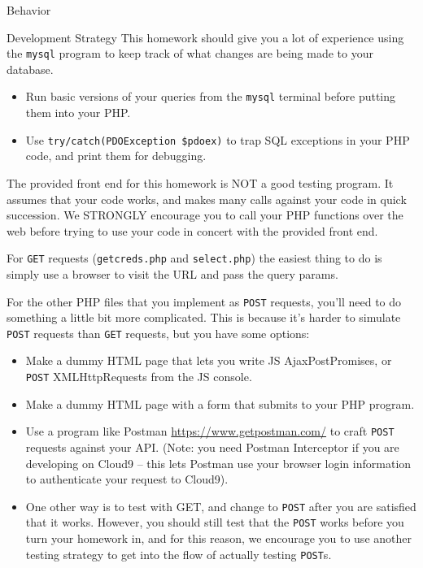 \documentclass[programming]{../../../../mfcs}
\begin{document}
\begin{question}{Behavior}
\end{question}

\begin{question}{Development Strategy}
    This homework should give you a lot of experience using the \texttt{mysql} program to keep track of what changes
    are being made to your database.
     \begin{itemize}
       \item Run basic versions of your queries from the \texttt{mysql} terminal before putting them
         into your PHP.
       \item Use \texttt{try/catch(PDOException \$pdoex)} to trap SQL exceptions in your PHP code,
         and print them for debugging.
     \end{itemize}

    The provided front end for this homework is NOT a good testing program. It assumes that your code works, and makes
    many calls against your code in quick succession. We STRONGLY encourage you to call your PHP functions over the web
    before trying to use your code in concert with the provided front end.
    \newline

    For \texttt{GET} requests (\texttt{getcreds.php} and \texttt{select.php}) the easiest thing to do is simply use a browser to visit the URL and pass the query params.
    \newline

    For the other PHP files that you implement as \texttt{POST} requests, you'll need to do something a little bit more
    complicated. This is because it's harder to simulate \texttt{POST} requests than \texttt{GET} requests, but you have some options:

     \begin{itemize}
       \item Make a dummy HTML page that lets you write JS AjaxPostPromises, or \texttt{POST}
         XMLHttpRequests from the JS console.
       \item Make a dummy HTML page with a form that submits to your PHP program.
       \item Use a program like Postman \url{https://www.getpostman.com/} to craft \texttt{POST} requests against your API.
             (Note: you need Postman Interceptor if you are developing on Cloud9 -- this lets Postman use your browser
             login information to authenticate your request to Cloud9).
       \item One other way is to test with GET, and change to \texttt{POST} after you are satisfied that it works. However, you
             should still test that the \texttt{POST} works before you turn your homework in, and for this reason, we encourage you to use
             another testing strategy to get into the flow of actually testing \texttt{POST}s.
     \end{itemize}


\end{question}
\end{document}
